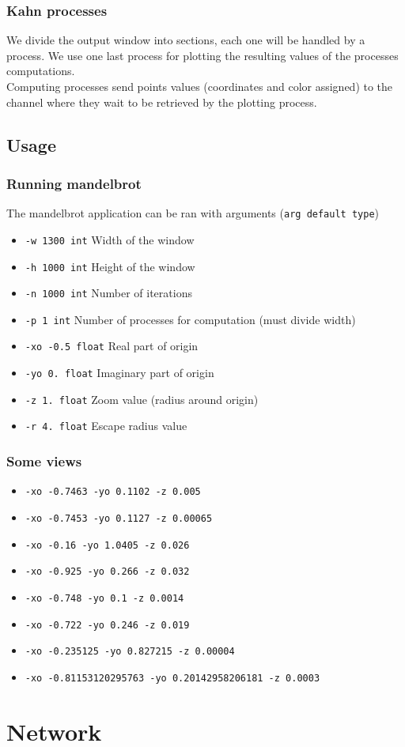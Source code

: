 \documentclass{article}
\begin{document}
\subsubsection{Kahn processes}
We divide the output window into sections, each one will be handled by a process. We use one last process for plotting the resulting values of the processes computations.\\
Computing processes send points values (coordinates and color assigned) to the channel where they wait to be retrieved by the plotting process.

\subsection{Usage}
\subsubsection{Running mandelbrot}
The mandelbrot application can be ran with arguments (\texttt{arg default type})
\begin{itemize}[label={}]
	\item \texttt{-w 1300 int} Width of the window
	\item \texttt{-h 1000 int} Height of the window
	\item \texttt{-n 1000 int} Number of iterations
	\item \texttt{-p 1 int} Number of processes for computation (must divide width)
	\item \texttt{-xo -0.5 float} Real part of origin
	\item \texttt{-yo 0. float} Imaginary part of origin
	\item \texttt{-z 1. float} Zoom value (radius around origin)
	\item \texttt{-r 4. float} Escape radius value 
	
\end{itemize}

\subsubsection{Some views}
\begin{itemize}[label={}]
	\item \texttt{-xo -0.7463 -yo 0.1102 -z 0.005}
	\item \texttt{-xo -0.7453 -yo 0.1127 -z 0.00065}
	\item \texttt{-xo -0.16 -yo 1.0405 -z 0.026}
	\item \texttt{-xo -0.925 -yo 0.266 -z 0.032}
	\item \texttt{-xo -0.748 -yo 0.1 -z 0.0014}
	\item \texttt{-xo -0.722 -yo 0.246 -z 0.019}
	\item \texttt{-xo -0.235125 -yo 0.827215 -z 0.00004}
	\item \texttt{-xo -0.81153120295763 -yo 0.20142958206181 -z 0.0003}
\end{itemize}\section{Network}
\end{document}
